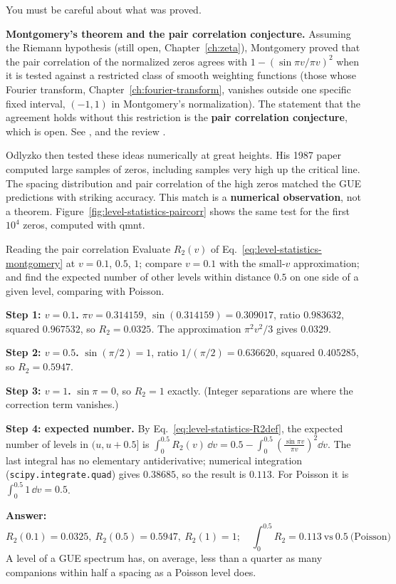 You must be careful about what was proved.

\begin{beyond}
\textbf{Montgomery's theorem and the pair correlation conjecture.} Assuming the Riemann hypothesis (still open, Chapter~\ref{ch:zeta}), Montgomery proved that the pair correlation of the normalized zeros agrees with $1-(\sin\pi v/\pi v)^2$ when it is tested against a restricted class of smooth weighting functions (those whose Fourier transform, Chapter~\ref{ch:fourier-transform}, vanishes outside one specific fixed interval, $(-1,1)$ in Montgomery's normalization). The statement that the agreement holds without this restriction is the \textbf{pair correlation conjecture}, which is open. See \cite{montgomery}, and the review \cite{schumayer}.
\end{beyond}

Odlyzko then tested these ideas numerically at great heights. His 1987 paper \cite{odlyzko87} computed large samples of zeros, including samples very high up the critical line. The spacing distribution and pair correlation of the high zeros matched the GUE predictions with striking accuracy. This match is a \textbf{numerical observation}, not a theorem. Figure~\ref{fig:level-statistics-paircorr} shows the same test for the first $10^4$ zeros, computed with qmnt.

\begin{sample}{Reading the pair correlation}
Evaluate $R_2(v)$ of Eq.~\eqref{eq:level-statistics-montgomery} at $v=0.1$, $0.5$, $1$; compare $v=0.1$ with the small-$v$ approximation; and find the expected number of other levels within distance $0.5$ on one side of a given level, comparing with Poisson.

\textbf{Step 1: $v=0.1$.} $\pi v=0.314159$, $\sin(0.314159)=0.309017$, ratio $0.983632$, squared $0.967532$, so $R_2=0.0325$. The approximation $\pi^2v^2/3$ gives $0.0329$.

\textbf{Step 2: $v=0.5$.} $\sin(\pi/2)=1$, ratio $1/(\pi/2)=0.636620$, squared $0.405285$, so $R_2=0.5947$.

\textbf{Step 3: $v=1$.} $\sin\pi=0$, so $R_2=1$ exactly. (Integer separations are where the correction term vanishes.)

\textbf{Step 4: expected number.} By Eq.~\eqref{eq:level-statistics-R2def}, the expected number of levels in $(u,u+0.5]$ is $\int_0^{0.5}R_2(v)\,\dd v=0.5-\int_0^{0.5}\left(\frac{\sin\pi v}{\pi v}\right)^2\dd v$. The last integral has no elementary antiderivative; numerical integration (\texttt{scipy.integrate.quad}) gives $0.38685$, so the result is $0.113$. For Poisson it is $\int_0^{0.5}1\,\dd v=0.5$.

\textbf{Answer:} \[\boxed{R_2(0.1)=0.0325,\ R_2(0.5)=0.5947,\ R_2(1)=1;\quad \int_0^{0.5}R_2=0.113\ \text{vs}\ 0.5\ \text{(Poisson)}}\]
A level of a GUE spectrum has, on average, less than a quarter as many companions within half a spacing as a Poisson level does.
\end{sample}


